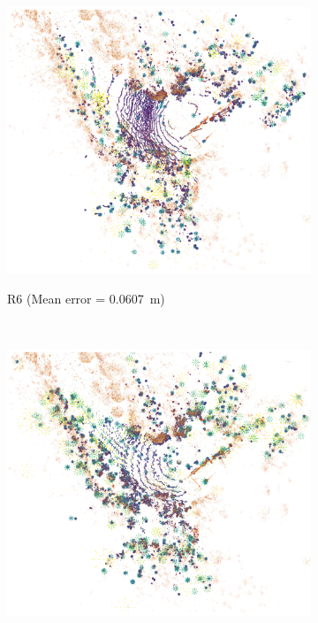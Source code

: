 \begin{figure}[tpbh!]
	\begin{center}
		\begin{subfigure}[b]{0.3\textwidth}
			\includegraphics[width=\linewidth]{figs/run10_init_fail/run_6.pdf}
			\label{fig:r6_pcl}
			\caption{R6 (Mean error = \SI{0.0607}{m})}
			\vspace{0.2in}
		\end{subfigure}%
		~
		\begin{subfigure}[b]{0.3\textwidth}
			\includegraphics[width=\linewidth]{figs/run10_init_fail/run_10.pdf}

\end{subfigure}
\end{center}
\end{figure}
